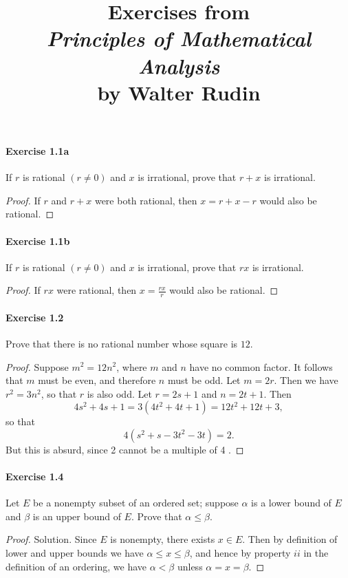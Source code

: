\documentclass{article}
\title{\textbf{
Exercises from \\
\textit{Principles of Mathematical Analysis} \\
by Walter Rudin
}}
\date{}
\theoremstyle{definition}
\begin{document}
\maketitle

\paragraph{Exercise 1.1a} If $r$ is rational $(r \neq 0)$ and $x$ is irrational, prove that $r+x$ is irrational.
\begin{proof}
    If $r$ and $r+x$ were both rational, then $x=r+x-r$ would also be rational.
\end{proof}


\paragraph{Exercise 1.1b} If $r$ is rational $(r \neq 0)$ and $x$ is irrational, prove that $rx$ is irrational.
\begin{proof}
    If $r x$ were rational, then $x=\frac{r x}{r}$ would also be rational.
\end{proof}


\paragraph{Exercise 1.2} Prove that there is no rational number whose square is $12$.
\begin{proof}
    Suppose $m^2=12 n^2$, where $m$ and $n$ have no common factor. It follows that $m$ must be even, and therefore $n$ must be odd. Let $m=2 r$. Then we have $r^2=3 n^2$, so that $r$ is also odd. Let $r=2 s+1$ and $n=2 t+1$. Then
$$
4 s^2+4 s+1=3\left(4 t^2+4 t+1\right)=12 t^2+12 t+3,
$$
so that
$$
4\left(s^2+s-3 t^2-3 t\right)=2 .
$$
But this is absurd, since 2 cannot be a multiple of 4 .
\end{proof}


\paragraph{Exercise 1.4} Let $E$ be a nonempty subset of an ordered set; suppose $\alpha$ is a lower bound of $E$ and $\beta$ is an upper bound of $E$. Prove that $\alpha \leq \beta$.
\begin{proof}
    Solution. Since $E$ is nonempty, there exists $x \in E$. Then by definition of lower and upper bounds we have $\alpha \leq x \leq \beta$, and hence by property $i i$ in the definition of an ordering, we have $\alpha<\beta$ unless $\alpha=x=\beta$.
\end{proof}
\end{document}
